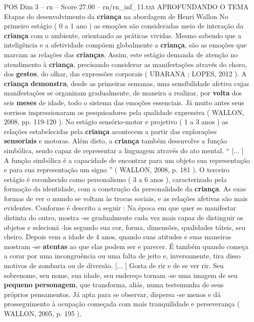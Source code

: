 \begin{textsample}{POS Dim 3 – rn – Score 27.00 – rn/rn\_inf\_11.txt}  \label{ex:f3_pos_094}
APROFUNDANDO O TEMA Etapas do desenvolvimento da \textbf{criança} na abordagem de Henri Wallon No primeiro estágio ( 0 a 1 ano ) as emoções são consideradas meio de interação da \textbf{criança} com o ambiente, orientando as práticas vividas.
Mesmo sabendo que a inteligência e a afetividade compõem globalmente a \textbf{criança}, são as emoções que marcam as relações das \textbf{crianças}.
Assim, este estágio demanda de atenção no atendimento à \textbf{criança}, precisando considerar as manifestações através do choro, dos \textbf{gestos}, do olhar, das expressões corporais ( UBARANA ; LOPES, 2012 ).
A \textbf{criança} \textbf{demonstra}, desde as primeiras semanas, uma sensibilidade afetiva cujas manifestações se organizam gradualmente, de maneira a realizar, por \textbf{volta} dos seis \textbf{meses} de idade, todo o sistema das emoções essenciais.
Já muito antes seus sorrisos impressionaram os pesquisadores pela qualidade expressiva ( WALLON, 2008, pp. 119-120 ).
No estágio sensório-motor e projetivo ( 1 a 3 anos ) as relações estabelecidas pela \textbf{criança} acontecem a partir das explorações \textbf{sensoriais} e motoras.
Além disto, a \textbf{criança} também desenvolve a função simbólica, sendo capaz de representar a linguagem através do ato mental. “ [... ] A função simbólica é a capacidade de encontrar para um objeto sua representação e para sua representação um signo ” ( WALLON, 2008, p. 181 ).
O terceiro estágio é reconhecido como personalismo ( 3 a 6 anos ), caracterizado pela formação da identidade, com a construção da personalidade da \textbf{criança}.
As suas formas de ver o mundo se voltam às trocas sociais, e as relações afetivas são mais evidentes.
Conforme é descrito a seguir : Na época em que quer se manifestar distinta do outro, mostra -se gradualmente cada vez mais capaz de distinguir os objetos e selecioná -los segundo sua cor, forma, dimensões, qualidades táteis, seu cheiro.
Depois vem a idade de 4 anos, quando suas atitudes e suas maneiras mostram -se \textbf{atentas} ao que elas podem ser e parecer.
É também quando começa a corar por uma incongruência ou uma falta de jeito e, inversamente, tira disso motivos de zombaria ou de diversão. [... ] Gosta de rir e de se ver rir.
Seu sobrenome, seu nome, sua idade, seu endereço tornam -se uma imagem de seu \textbf{pequeno} \textbf{personagem}, que transforma, aliás, numa testemunha de seus próprios pensamentos.
Já apta para se observar, dispersa -se menos e dá prosseguimento à ocupação começada com mais tranquilidade e perseverança ( WALLON, 2005, p. 195 ).

\end{textsample}
